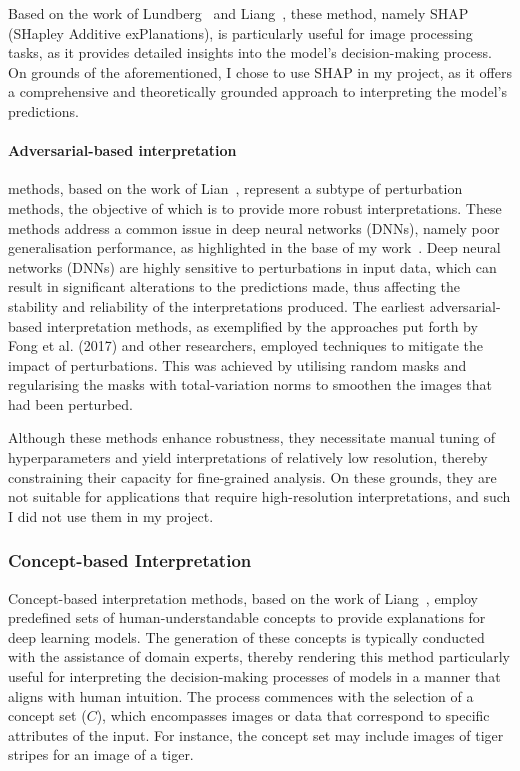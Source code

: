Based on the work of Lundberg~\cite{lundberg2017unifiedapproachinterpretingmodel} and Liang~\cite{LIANG2021168},
these method, namely SHAP (SHapley Additive exPlanations), is particularly useful for image processing tasks, as it provides detailed insights into the model's decision-making process.
On grounds of the aforementioned, I chose to use SHAP in my project, as it offers a comprehensive and theoretically grounded approach to interpreting the model's predictions.

\paragraph{Adversarial-based interpretation}\label{par:adversarial-based-interpretation}

methods, based on the work of Lian~\cite{LIANG2021168},
represent a subtype of perturbation methods,
the objective of which is to provide more robust interpretations.
These methods address a common issue in deep neural networks (DNNs), namely poor generalisation performance, as highlighted in the base of my work~\cite{LIANG2021168}.
Deep neural networks (DNNs) are highly sensitive to perturbations in input data, which can result in significant alterations to the predictions made,
thus affecting the stability and reliability of the interpretations produced.
The earliest adversarial-based interpretation methods, as exemplified by the approaches put forth by Fong et al. (2017) and other researchers,
employed techniques to mitigate the impact of perturbations.
This was achieved by utilising random masks and regularising the masks with total-variation norms to smoothen the images that had been perturbed.

Although these methods enhance robustness, they necessitate manual tuning of hyperparameters and yield interpretations of relatively low resolution,
thereby constraining their capacity for fine-grained analysis.
On these grounds, they are not suitable for applications that require high-resolution interpretations, and such I did not use them in my project.

\subsubsection{Concept-based Interpretation}\label{subsubsec:concept-based-interpretation}

Concept-based interpretation methods, based on the work of Liang~\cite{LIANG2021168}, employ predefined sets of human-understandable concepts to provide explanations for deep learning models.
The generation of these concepts is typically conducted with the assistance of domain experts, thereby rendering this method particularly
useful for interpreting the decision-making processes of models in a manner that aligns with human intuition.
The process commences with the selection of a concept set (\(C\)), which encompasses images or data that correspond to specific attributes of the input.
For instance, the concept set may include images of tiger stripes for an image of a tiger.

